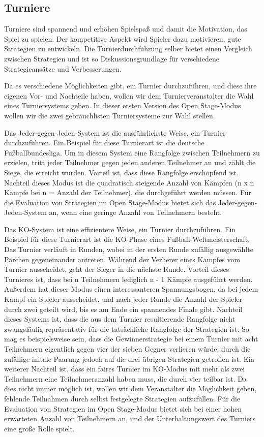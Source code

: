 \subsection{Turniere}

Turniere sind spannend und erhöhen Spielspaß und damit die Motivation, das Spiel zu spielen. Der
kompetitive Aspekt wird Spieler dazu motivieren, gute Strategien zu entwickeln. Die
Turnierdurchführung selber bietet einen Vergleich zwischen Strategien und ist so
Diskussionsgrundlage für verschiedene Strategieansätze und Verbesserungen.

Da es verschiedene Möglichkeiten gibt, ein Turnier durchzuführen, und diese ihre eigenen Vor- und
Nachteile haben, wollen wir dem Turnierveranstalter die Wahl eines Turniersystems geben. In dieser
ersten Version des Open Stage-Modus wollen wir die zwei gebräuchlisten Turniersysteme zur Wahl
stellen.

Das Jeder-gegen-Jeden-System ist die ausführlichste Weise, ein Turnier durchzuführen. Ein Beispiel
für diese Turnierart ist die deutsche Fußballbundesliga. Um in diesem System eine Rangfolge zwischen
Teilnehmern zu erzielen, tritt jeder Teilnehmer gegen jeden anderen Teilnehmer an und zählt die
Siege, die erreicht wurden. Vorteil ist, dass diese Rangfolge erschöpfend ist. Nachteil dieses
Modus ist die quadratisch steigende Anzahl von Kämpfen (n x n Kämpfe bei n = Anzahl der Teilnehmer),
die durchgeführt werden müssen. Für die Evaluation von Strategien im Open Stage-Modus bietet sich das
Jeder-gegen-Jeden-System an, wenn eine geringe Anzahl von Teilnehmern besteht.

Das KO-System ist eine effizientere Weise, ein Turnier durchzuführen. Ein Beispiel für diese
Turnierart ist die KO-Phase eines Fußball-Weltmeisterschaft. Das Turnier verläuft in Runden, wobei
in der ersten Runde zufällig ausgewählte Pärchen gegeneinander antreten. Während der Verlierer eines
Kampfes vom Turnier ausscheidet, geht der Sieger in die nächste Runde. Vorteil dieses Turnieres ist,
dass bei n Teilnehmern lediglich n - 1 Kämpfe ausgeführt werden. Außerdem hat dieser Modus einen
interessanteren Spannungsbogen, da bei jedem Kampf ein Spieler ausscheidet, und nach jeder Runde die
Anzahl der Spieler durch zwei geteilt wird, bis es am Ende ein spannendes Finale gibt. Nachteil
dieses Systems ist, dass die aus dem Turnier resultierende Rangfolge nicht zwangsläufig
repräsentativ für die tatsächliche Rangfolge der Strategien ist. So mag es beispielsweise sein, dass
die Gewinnerstrategie bei einem Turnier mit acht Teilnehmern eigentlich gegen vier der sieben Gegner
verlieren würde, durch die zufällige initale Paarung jedoch auf die drei übrigen Strategien
getroffen ist. Ein weiterer Nachteil ist, dass ein faires Turnier im KO-Modus mit mehr als zwei
Teilnehmern eine Teilnehmeranzahl haben muss, die durch vier teilbar ist. Da dies nicht immer
möglich ist, wollen wir dem Veranstalter die Möglichkeit geben, fehlende Teilnahmen durch selbst
festgelegte Strategien aufzufüllen. Für die Evaluation von Strategien im Open Stage-Modus bietet
sich bei einer hohen erwarteten Anzahl von Teilnehmern an, und der Unterhaltungswert des Turniers
eine große Rolle spielt. 

